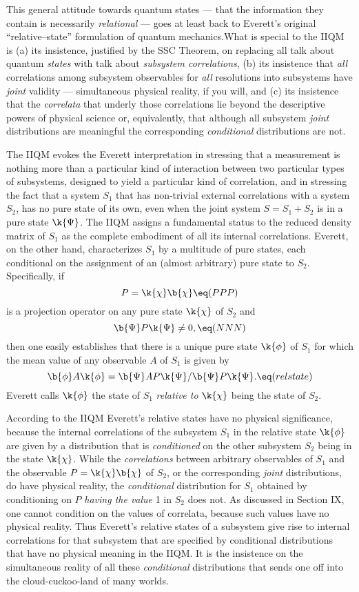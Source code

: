 This general attitude towards quantum states --- that the information
they contain is necessarily {\it relational\/} --- goes at least back
to Everett's original ``relative--state'' formulation of quantum
mechanics.\fn What is special to the IIQM
is (a) its insistence, justified by the SSC Theorem, on replacing
all talk about quantum {\it states\/} with talk about {\it subsystem
correlations\/}, (b) its insistence that {\it all\/} correlations
among subsystem observables for {\it all\/} resolutions into subsystems
have {\it joint\/} validity --- simultaneous physical reality, if you will,
and (c) its insistence that the {\it correlata\/} that underly those
correlations lie beyond the descriptive powers of physical science or,
equivalently, that although all subsystem {\it joint\/} distributions
are meaningful the corresponding {\it conditional\/} distributions are
not.

The IIQM evokes the Everett interpretation in stressing that a
measurement is nothing more than a particular kind of
interaction between two particular types of subsystems, designed to
yield a particular kind of correlation, and in stressing the fact that
a system $S_1$ that has non-trivial external correlations with a system
$S_2$, has no pure state of its own, even when the joint system $S =
S_1 + S_2$ is in a pure state $\k{\Psi}$.  The IIQM assigns a
fundamental status to the reduced density matrix of $S_1$ as the
complete embodiment of all its internal correlations.  Everett, on the
other hand, characterizes $S_1$ by a multitude of pure states, each
conditional on the assignment of an (almost arbitrary) pure state to
$S_2$.  Specifically, if $$P = \k{\chi}\b{\chi}\eq(PPP)$$ is a projection
operator on any pure state $\k{\chi}$ of $S_2$ and $$\b{\Psi}P\k{\Psi}
\neq 0,\eq(NNN)$$ then one easily establishes that there is a unique
pure state $\k{\phi}$ of $S_1$ for which the mean value of any
observable $A$ of $S_1$ is given by $$ \b{\phi}A\k{\phi} =
\b{\Psi}AP\k{\Psi}/\b{\Psi}P\k{\Psi}.\eq(relstate)$$ Everett calls
$\k{\phi}$ the state of $S_1$ {\it relative to\/} $\k{\chi}$ being the
state of $S_2$.

According to the IIQM Everett's relative states have no physical
significance, because the internal correlations of the
subsystem $S_1$ in the relative state $\k{\phi}$ are given by a
distribution that is {\it conditioned\/} on the other subsystem $S_2$
being in the state $\k{\chi}$.  While the {\it correlations\/} between
arbitrary observables of $S_1$ and the observable $P =
\k{\chi}\b{\chi}$ of $S_2$, or the corresponding {\it joint\/}
distributions, do have physical reality, the {\it conditional\/}
distribution for $S_1$ obtained by conditioning on $P$ {\it having the
value\/} 1 in $S_2$ does not.  As discussed in Section IX, one cannot
condition on the values of correlata, because such values have no
physical reality.  Thus Everett's relative states of a subsystem give
rise to internal correlations for that subsystem that are specified by
conditional distributions that have no physical meaning in the IIQM.
It is the insistence on the simultaneous reality of all these {\it
conditional\/} distributions that sends one off into the
cloud-cuckoo-land of many worlds.

